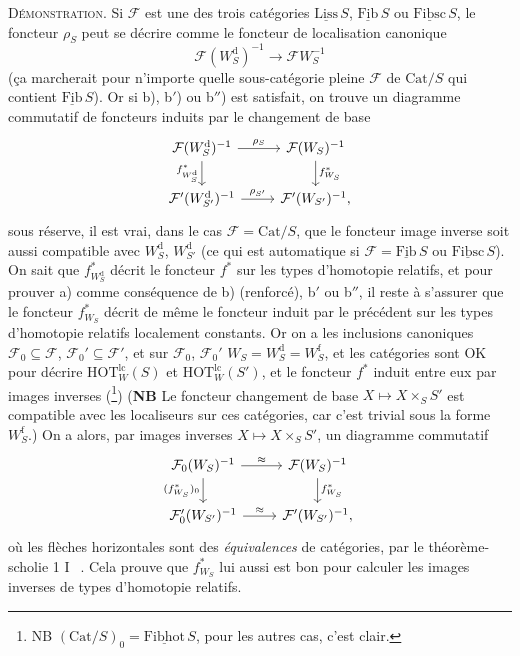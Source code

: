 \documentclass[11pt]{article}
\newcommand{\printedpage}[1]{\marginpar{\footnotesize p.~#1}}
\newcommand{\msp}[1]{\marginpar{\footnotesize [#1]}}
\newcommand{\und}[1]{\underline{\mathrm{#1}}}
\newcommand{\HOT}{\mathrm{HOT}}
\newcommand{\Cat}{\mathrm{Cat}}
\begin{document}
\textsc{Démonstration.} Si $\mathcal{F}$ est une des trois catégories $\und{Liss}\,S$, $\und{Fib}\,S$ ou $\und{Fibsc}\,S$, le foncteur $\rho_S$ peut se décrire comme le foncteur de localisation canonique
\[
\mathcal{F}(W_S^{\mathrm{d}})^{-1} \longrightarrow \mathcal{F}W_S^{-1}
\]
(ça marcherait pour n'importe quelle sous-catégorie pleine $\mathcal{F}$ de $\Cat/S$ qui contient $\und{Fib}\,S$). Or si b), b$'$) ou b$''$) est satisfait, on trouve un diagramme commutatif de foncteurs induits par le changement de base
\[
\begin{tikzcd}
\mathcal{F}(W_S^{\mathrm{d}})^{-1} \arrow[r, "\rho_S"] \arrow[d, "f^*_{W_S^{\mathrm{d}}}"'] & \mathcal{F}(W_S)^{-1} \arrow[d, "f^*_{W_S}"] \\
\mathcal{F}'(W_{S'}^{\mathrm{d}})^{-1} \arrow[r, "\rho_{S'}"] & \mathcal{F}'(W_{S'})^{-1},
\end{tikzcd}
\]
sous réserve, il est vrai, dans le cas $\mathcal{F} = \Cat/S$, que le foncteur image inverse soit aussi compatible avec $W_S^{\mathrm{d}}$, $W_{S'}^{\mathrm{d}}$ (ce qui est automatique si $\mathcal{F} = \und{Fib}\,S$ ou $\und{Fibsc}\,S$). On sait que $f^*_{W_S^{\mathrm{d}}}$ décrit le foncteur $f^*$ sur les types d'homotopie relatifs, et pour prouver a) comme conséquence
\msp{page 125}
de b) (renforcé), b$'$ ou b$''$, il reste à s'assurer que le foncteur $f^*_{W_S}$ décrit de même le foncteur induit par le précédent sur les types d'homotopie relatifs localement constants. Or on a les inclusions canoniques $\mathcal{F}_0 \subseteq \mathcal{F}$, $\mathcal{F}_0' \subseteq \mathcal{F}'$, et sur $\mathcal{F}_0$, $\mathcal{F}_0'$ $W_S = W_S^{\mathrm{d}} = W_S^{\mathrm{f}}$, et les catégories sont OK pour décrire $\HOT_W^{\mathrm{lc}}(S)$ et $\HOT_W^{\mathrm{lc}}(S')$, et le foncteur $f^*$ induit entre eux par images inverses (\footnote[65]{NB $(\Cat/S)_0 = \und{Fibhot}\,S$, pour les autres cas, c'est clair.}) (\textbf{NB} Le foncteur changement de base $X \longmapsto X \times_S S'$ est compatible avec les localiseurs sur ces catégories, car c'est trivial sous la forme $W_S^{\mathrm{f}}$.) On a alors, par images inverses $X \longmapsto X \times_S S'$, un diagramme commutatif
\[
\begin{tikzcd}
\mathcal{F}_0(W_S)^{-1} \arrow[r, "\approx"] \arrow[d, "(f^*_{W_S})_0"'] & \mathcal{F}(W_S)^{-1} \arrow[d, "f^*_{W_S}"] \\
\mathcal{F}_0'(W_{S'})^{-1} \arrow[r, "\approx"] & \mathcal{F}'(W_{S'})^{-1},
\end{tikzcd}
\]
\printedpage{78}
où les flèches horizontales sont des \textit{équivalences} de catégories, par le théorème-scholie 1 \textcircled{I}~. Cela prouve que $f^*_{W_S}$ lui aussi est bon pour calculer les images inverses de types d'homotopie relatifs.
\end{document}
